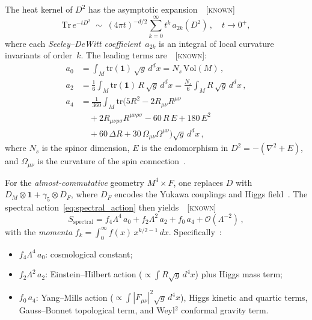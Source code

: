 \documentclass[prd,twocolumn,superscriptaddress,longbibliography]{revtex4-2}
\newcommand{\Tr}{\mathrm{Tr}}
\newcommand{\tr}{\mathrm{tr}}
\newcommand{\Vol}{\mathrm{Vol}}
\newcommand{\known}{\textsc{[known]}}
\begin{document}
The heat kernel of $D^2$ has the asymptotic
expansion~\cite{Vassilevich2003,Gilkey1995}~\known
\begin{equation}\label{eq:heat_kernel}
  \Tr\, e^{-tD^2}
  \;\sim\;
  (4\pi t)^{-d/2}
  \sum_{k=0}^{\infty} t^k\, a_{2k}(D^2)\,,
  \quad t\to 0^+,
\end{equation}
where each \emph{Seeley--DeWitt coefficient}~$a_{2k}$ is an
integral of local curvature invariants of order~$k$.
The leading terms are~\cite{Vassilevich2003,BGV2004}~\known:
\begin{align}
  a_0 &= \int_M \tr(\mathbf{1})\,\sqrt{g}\,d^dx
       = N_s\,\Vol(M)\,,
  \label{eq:a0_def}\\[4pt]
  a_2 &= \frac{1}{6}\int_M \tr(\mathbf{1})\, R\,\sqrt{g}\,d^dx
       = \frac{N_s}{6}\int_M R\,\sqrt{g}\,d^dx\,,
  \label{eq:a2_def}\\[4pt]
  a_4 &= \frac{1}{360}\int_M \tr\!\Big(
       5R^2 - 2R_{\mu\nu}R^{\mu\nu}
       \nonumber\\
       &\quad
       {}+ 2R_{\mu\nu\rho\sigma}R^{\mu\nu\rho\sigma}
       - 60\,R\,E + 180\,E^2
       \nonumber\\
       &\quad
       {}+ 60\,\Delta R
       + 30\,\Omega_{\mu\nu}\Omega^{\mu\nu}
       \Big)\sqrt{g}\,d^dx\,,
  \label{eq:a4_def}
\end{align}
where $N_s$ is the spinor dimension, $E$ is the endomorphism
in $D^2 = -(\nabla^2 + E)$, and $\Omega_{\mu\nu}$ is the
curvature of the spin connection~\cite{Gilkey1995}.

For the \emph{almost-commutative} geometry
$M^4\times F$, one replaces $D$ with
$D_M\otimes\mathbf{1} + \gamma_5\otimes D_F$, where
$D_F$ encodes the Yukawa couplings and Higgs
field~\cite{CC1997,CCM2007}.
The spectral action~\eqref{eq:spectral_action} then
yields~\cite{CC1997,vS2024}~\known
\begin{equation}\label{eq:spectral_expansion}
  S_{\mathrm{spectral}}
  = f_4\Lambda^4\, a_0
  + f_2\Lambda^2\, a_2
  + f_0\, a_4
  + \mathcal{O}(\Lambda^{-2})\,,
\end{equation}
with the \emph{momenta} $f_k = \int_0^\infty f(x)\,x^{k/2-1}\,dx$.
Specifically~\cite{CCM2007,vS2024}:
\begin{itemize}
\item $f_4\Lambda^4\, a_0$: cosmological constant;
\item $f_2\Lambda^2\, a_2$: Einstein--Hilbert action
  ($\propto \int R\sqrt{g}\,d^4x$) plus Higgs mass term;
\item $f_0\, a_4$: Yang--Mills action
  ($\propto \int |F_{\mu\nu}|^2\sqrt{g}\,d^4x$), Higgs
  kinetic and quartic terms, Gauss--Bonnet topological
  term, and Weyl$^2$ conformal gravity term.
\end{itemize}
\end{document}
